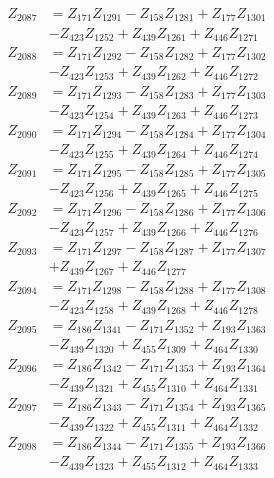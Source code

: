 \begin{multicols}{2}
\begin{align}
Z_{2087} &= Z_{171}Z_{1291} - Z_{158}Z_{1281} + Z_{177}Z_{1301}  \nonumber \\
&- Z_{423}Z_{1252} + Z_{439}Z_{1261} + Z_{446}Z_{1271} \nonumber \\
Z_{2088} &= Z_{171}Z_{1292} - Z_{158}Z_{1282} + Z_{177}Z_{1302}  \nonumber \\
&- Z_{423}Z_{1253} + Z_{439}Z_{1262} + Z_{446}Z_{1272} \nonumber \\
Z_{2089} &= Z_{171}Z_{1293} - Z_{158}Z_{1283} + Z_{177}Z_{1303}  \nonumber \\
&- Z_{423}Z_{1254} + Z_{439}Z_{1263} + Z_{446}Z_{1273} \nonumber \\
Z_{2090} &= Z_{171}Z_{1294} - Z_{158}Z_{1284} + Z_{177}Z_{1304}  \nonumber \\
&- Z_{423}Z_{1255} + Z_{439}Z_{1264} + Z_{446}Z_{1274} \nonumber \\
Z_{2091} &= Z_{171}Z_{1295} - Z_{158}Z_{1285} + Z_{177}Z_{1305}  \nonumber \\
&- Z_{423}Z_{1256} + Z_{439}Z_{1265} + Z_{446}Z_{1275} \nonumber \\
Z_{2092} &= Z_{171}Z_{1296} - Z_{158}Z_{1286} + Z_{177}Z_{1306}  \nonumber \\
&- Z_{423}Z_{1257} + Z_{439}Z_{1266} + Z_{446}Z_{1276} \nonumber \\
Z_{2093} &= Z_{171}Z_{1297} - Z_{158}Z_{1287} + Z_{177}Z_{1307}  \nonumber \\
&+ Z_{439}Z_{1267} + Z_{446}Z_{1277} \nonumber \\
Z_{2094} &= Z_{171}Z_{1298} - Z_{158}Z_{1288} + Z_{177}Z_{1308}  \nonumber \\
&- Z_{423}Z_{1258} + Z_{439}Z_{1268} + Z_{446}Z_{1278} \nonumber \\
Z_{2095} &= Z_{186}Z_{1341} - Z_{171}Z_{1352} + Z_{193}Z_{1363}  \nonumber \\
&- Z_{439}Z_{1320} + Z_{455}Z_{1309} + Z_{464}Z_{1330} \nonumber \\
Z_{2096} &= Z_{186}Z_{1342} - Z_{171}Z_{1353} + Z_{193}Z_{1364}  \nonumber \\
&- Z_{439}Z_{1321} + Z_{455}Z_{1310} + Z_{464}Z_{1331} \nonumber \\
Z_{2097} &= Z_{186}Z_{1343} - Z_{171}Z_{1354} + Z_{193}Z_{1365}  \nonumber \\
&- Z_{439}Z_{1322} + Z_{455}Z_{1311} + Z_{464}Z_{1332} \nonumber \\
Z_{2098} &= Z_{186}Z_{1344} - Z_{171}Z_{1355} + Z_{193}Z_{1366}  \nonumber \\
&- Z_{439}Z_{1323} + Z_{455}Z_{1312} + Z_{464}Z_{1333} \nonumber \\

\end{align}
\end{multicols}
